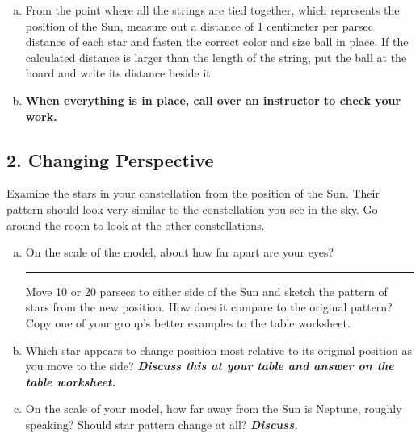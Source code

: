 \documentclass[main.tex]{subfiles}
\begin{document}
\begin{enumerate} [a.]
\newline
(i) Type: O or B-violet; A-blue; F-green; G-yellow; K-orange; M-red.
\newline
\newline
(ii) Luminosity class: I-large; II or III-medium; IV or V-small
\newline
\newline 
If your star has an unusual classification try googling it for more information and choose the closest representation for it that you can. Write down the color and size of the ball you decide best represents your star on the table worksheet.
    \item From the point where all the strings are tied together, which represents the position of the Sun, measure out a distance of 1 centimeter per parsec distance of each star and fasten the correct color and size ball in place. If the calculated distance is larger than the length of the string, put the ball at the board and write its distance beside it.
    \item \textbf{When everything is in place, call over an instructor to check your work.}
\end{enumerate}

\subsection*{2. Changing Perspective}
Examine the stars in your constellation from the position of the Sun. Their pattern should look very similar to the constellation you see in the sky. Go around the room to look at the other constellations. 
\begin{enumerate} [a.]
    \item On the scale of the model, about how far apart are your eyes?\rule{2cm}{.15mm} 
    \newline 
Move 10 or 20 parsecs to either side of the Sun and sketch the pattern of stars from the new position. How does it compare to the original pattern?
\newline
Copy one of your group's better examples to the table worksheet.
\item Which star appears to change position most relative to its original position as you move to the side? \textbf{\textit{Discuss this at your table and answer on the table worksheet.}}
\item On the scale of your model, how far away from the Sun is Neptune, roughly speaking? Should star pattern change at all? \textbf{\textit{Discuss.}}
\end{enumerate}
\end{document}
